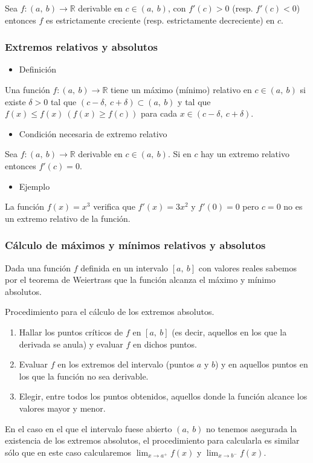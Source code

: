 Sea $f:(a,~b)\rightarrow\mathbb{R}$ derivable en $c\in(a,~b)$, con $f'(c)>0$ (resp. $f'(c)<0$) entonces $f$ es estrictamente creciente (resp. estrictamente decreciente) en $c$.
\subsubsection{Extremos relativos y absolutos}
\begin{itemize}[label=\color{red}\textbullet, leftmargin=*]
	\item \color{lightblue} Definición
\end{itemize}
Una función $f:(a,~b)\rightarrow\mathbb{R}$ tiene un máximo (mínimo) relativo en $c\in(a,~b)$ si existe $\delta>0$ tal que $(c-\delta,~c+\delta)\subset(a,~b)$ y tal que $f(x)\le f(x)~\left(f(x)\ge f(c)\right)$ para cada $x\in(c-\delta,~c+\delta)$.
\begin{itemize}[label=\color{red}\textbullet, leftmargin=*]
	\item \color{lightblue}Condición necesaria de extremo relativo
\end{itemize}
Sea $f:(a,~b)\rightarrow\mathbb{R}$ derivable en $c\in(a,~b)$. Si en $c$ hay un extremo relativo entonces $f'(c)=0$.
\begin{itemize}[label=\color{red}\textbullet, leftmargin=*]
	\item \color{lightblue}Ejemplo
\end{itemize}
La función $f(x)=x^3$ verifica que $f'(x)=3x^2$ y $f'(0)=0$ pero $c=0$ no es un extremo relativo de la función.
\subsubsection{Cálculo de máximos y mínimos relativos y absolutos} 
Dada una función $f$ definida en un intervalo $[a,~b]$ con valores reales sabemos por el teorema de Weiertrass que la función alcanza el máximo y mínimo absolutos.

Procedimiento para el cálculo de los extremos absolutos.
\begin{enumerate}[label=\arabic*)]
	\item Hallar los puntos críticos de $f$ en $[a,~b]$ (es decir, aquellos en los que la derivada se anula) y evaluar $f$ en dichos puntos.
	\item Evaluar $f$ en los extremos del intervalo (puntos $a$ y $b$) y en aquellos puntos en los que la función no sea derivable.
	\item Elegir, entre todos los puntos obtenidos, aquellos donde la función alcance los valores mayor y menor.
\end{enumerate}
En el caso en el que el intervalo fuese abierto $(a,~b)$ no tenemos asegurada la existencia de los extremos absolutos, el procedimiento para calcularla es similar sólo que en este caso calcularemos $\lim_{x\to a^+}f(x)$ y $\lim_{x\to b^-}f(x)$.
